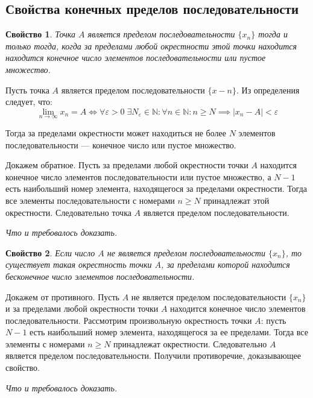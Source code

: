 \documentclass[a4paper,12pt,oneside]{extbook}
\newcommand{\newpar}{$ $\par\nobreak\ignorespaces}
\theoremstyle{numbered}
\newtheorem{property}{Свойство}[section]
\theoremstyle{unnumbered}
\theoremstyle{named}
\theoremstyle{unnumbered}
\theoremstyle{named}
\theoremstyle{named}
\theoremstyle{named}
\renewenvironment{proof}[1][]{\breakenv[Доказательство]{\if\relax\detokenize{#1}\relax\else\;\fi}{\textbf{#1}}}{\smallskip\newpar \hfill\textit{Что и требовалось доказать.}}
\begin{document}
\subsection{Свойства конечных пределов последовательности}%
\label{sub:Свойства конечных пределов последовательности}

\begin{property}
    Точка \(A\) является пределом последовательности \(\{x_n\}\) тогда и только тогда, когда за пределами любой окрестности этой точки находится находится конечное число элементов последовательности или пустое множество.
\end{property}

\begin{proof}
    Пусть точка \(A\) является пределом последовательности \(\{x-n\}\). Из определения следует, что:
    \[
        \lim_{n \to \infty}{x_n} = A \iff
        \forall \varepsilon > 0 \; \exists N_{\varepsilon} \in \mathbb{N}: \forall n \in \mathbb{N}: n \geq N \implies |x_n - A| < \varepsilon
    \]

    Тогда за пределами окрестности может находиться не более \(N\) элементов последовательности — конечное число или пустое множество.

    Докажем обратное. Пусть за пределами любой окрестности точки \(A\) находится конечное число элементов последовательности или пустое множество, а \(N - 1\) есть наибольший номер элемента, находящегося за пределами окрестности. Тогда все элементы последовательности с номерами \(n \geq N\) принадлежат этой окрестности. Следовательно точка \(A\) является пределом последовательности.
\end{proof}

\begin{property}
    Если число \(A\) не является пределом последовательности \(\{x_n\}\), то существует такая окрестность точки \(A\), за пределами которой находится бесконечное число элементов последовательности.
\end{property}

\begin{proof}
    Докажем от противного. Пусть \(A\) не является пределом последовательности \(\{x_n\}\) и за пределами любой окрестности точки \(A\) находится конечное число элементов последовательности. Рассмотрим произвольную окрестность точки \(A\): пусть \(N - 1\) есть наибольший номер элемента, находящегося за ее пределами. Тогда все элементы с номерами \(n \geq N\) принадлежат окрестности. Следовательно \(A\) является пределом последовательности. Получили противоречие, доказывающее свойство.
\end{proof}
\end{document}
